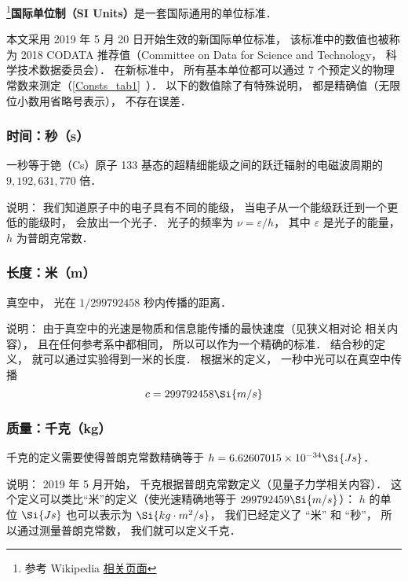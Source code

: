 

\footnote{参考 Wikipedia \href{https://en.wikipedia.org/wiki/International_System_of_Units}{相关页面}}\textbf{国际单位制（SI Units）}是一套国际通用的单位标准．

本文采用 2019 年 5 月 20 日开始生效的新国际单位标准， 该标准中的数值也被称为 2018 CODATA 推荐值（Committee on Data for Science and Technology， 科学技术数据委员会）． 在新标准中， 所有基本单位都可以通过 7 个预定义的物理常数来测定（\autoref{Consts_tab1}~）． 以下的数值除了有特殊说明， 都是精确值（无限位小数用省略号表示）， 不存在误差．

\subsubsection{时间：秒（s）}
一秒等于铯（Cs）原子 133 基态的超精细能级之间的跃迁辐射的电磁波周期的 $9,192,631,770$ 倍． 

说明： 我们知道原子中的电子具有不同的能级， 当电子从一个能级跃迁到一个更低的能级时， 会放出一个光子． 光子的频率为 $\nu  = \varepsilon /h$，   其中 $\varepsilon $ 是光子的能量， $h$ 为普朗克常数．

\subsubsection{长度：米（m）}
真空中， 光在 $1/299792458$ 秒内传播的距离．

说明： 由于真空中的光速是物质和信息能传播的最快速度（见狭义相对论 相关内容）， 且在任何参考系中都相同， 所以可以作为一个精确的标准． 结合秒的定义， 就可以通过实验得到一米的长度． 根据米的定义， 一秒中光可以在真空中传播
\begin{equation}
c = 299792458 \Si{m/s}
\end{equation}

\subsubsection{质量：千克（kg）}
千克的定义需要使得普朗克常数精确等于 $h = 6.62607015\times10^{-34}\Si{Js}$．

说明： 2019 年 5 月开始， 千克根据普朗克常数定义（见量子力学相关内容）． 这个定义可以类比“米”的定义（使光速精确地等于 $299792459\Si{m/s}$）： $h$ 的单位 $\Si{Js}$ 也可以表示为 $\Si{kg\cdot m^2/s}$， 我们已经定义了 “米” 和 “秒”， 所以通过测量普朗克常数， 我们就可以定义千克．

